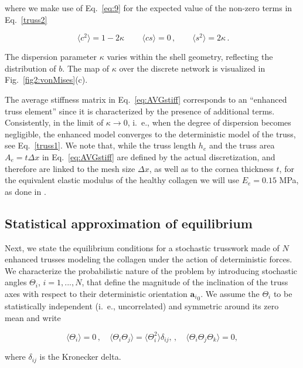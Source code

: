 \documentclass[preprint,12pt]{elsarticle}
\newcommand{\mbs}[1]{\boldsymbol{#1}}
\def\ba{{\mbs{a}}} \def\bb{{\mbs{b}}} \def\bc{{\mbs{c}}}
\begin{document}
where we make use of Eq.~\eqref{eq:9} for the expected value of the non-zero terms in Eq.~\eqref{truss2}
\begin{linenomath}
$$\
    \langle c^2 \rangle
	=
	1 - 2 \kappa
	\, \qquad
	\langle cs \rangle
	=
	0
	\, , \qquad
	\langle s^2 \rangle
	=
	2\kappa	\, .
$$
\end{linenomath}
The dispersion parameter $\kappa$ varies within the shell geometry,  reflecting the distribution of $b$. The map of $\kappa$ over the discrete network is visualized in Fig.~\ref{fig2:vonMises}(c).

The average stiffness matrix in Eq.~\eqref{eq:AVGstiff} corresponds to an ``enhanced truss element'' since it is characterized by the presence of additional terms. Consistently, in the limit of $\kappa \rightarrow 0$, i.~e., when the degree of dispersion becomes negligible, the enhanced model converges to the deterministic model of the truss, see Eq.~\eqref{truss1}. We note that, while the truss length $h_e$ and the truss area $A_e = t \Delta x$ in Eq.~\eqref{eq:AVGstiff} are defined by the actual discretization, and therefore are linked to the mesh size $\Delta x$, as well as to the cornea thickness $t$, for the equivalent elastic modulus of the healthy collagen we will use $E_e=0.15$ MPa, as done in \cite{pandolfi:2019}.

\subsection{Statistical approximation of equilibrium}
\label{sec:statApprox}

Next, we state the equilibrium conditions for a stochastic trusswork made of $N$ enhanced trusses modeling the collagen under the action of deterministic forces. We characterize the probabilistic nature of the problem by introducing stochastic angles $\Theta_i$, $i=1,...,N$, that define the magnitude of the inclination of the truss axes with respect to their deterministic orientation ${\ba_i}_0$. We assume the $\Theta_i$ to be statistically independent (i.~e., uncorrelated) and symmetric around its zero mean and write
\begin{linenomath}
\begin{equation}\label{eq:stat}
	\langle \Theta_i \rangle = 0 \,,\quad
	\langle \Theta_i \Theta_j \rangle = \langle \Theta_i^2 \rangle \delta_{ij}, \,,\quad \langle \Theta_i \Theta_j \Theta_k \rangle =0,
\end{equation}
\end{linenomath}
where $\delta_{ij}$ is the Kronecker delta.
\end{document}

